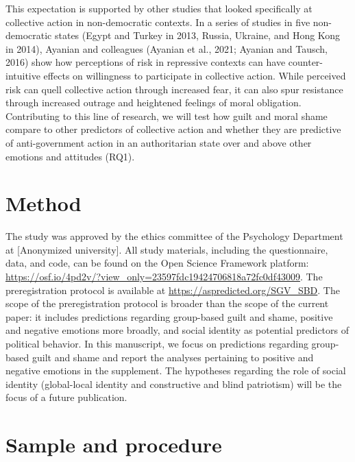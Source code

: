 \documentclass[
]{article}
\begin{document}
This expectation is supported by other studies that looked specifically at collective action in non-democratic contexts. In a series of studies in five non-democratic states (Egypt and Turkey in 2013, Russia, Ukraine, and Hong Kong in 2014), Ayanian and colleagues (Ayanian et al., 2021; Ayanian and Tausch, 2016) show how perceptions of risk in repressive contexts can have counter-intuitive effects on willingness to participate in collective action. While perceived risk can quell collective action through increased fear, it can also spur resistance through increased outrage and heightened feelings of moral obligation. Contributing to this line of research, we will test how guilt and moral shame compare to other predictors of collective action and whether they are predictive of anti-government action in an authoritarian state over and above other emotions and attitudes (RQ1).

\allsectionsfont{\centering}

\section*{Method}\label{method}

The study was approved by the ethics committee of the Psychology Department at {[}Anonymized university{]}. All study materials, including the questionnaire, data, and code, can be found on the Open Science Framework platform: \url{https://osf.io/4pd2v/?view_only=23597fdc19424706818a72fc0df43009}. The preregistration protocol is available at \url{https://aspredicted.org/SGV_SBD}. The scope of the preregistration protocol is broader than the scope of the current paper: it includes predictions regarding group-based guilt and shame, positive and negative emotions more broadly, and social identity as potential predictors of political behavior. In this manuscript, we focus on predictions regarding group-based guilt and shame and report the analyses pertaining to positive and negative emotions in the supplement. The hypotheses regarding the role of social identity (global-local identity and constructive and blind patriotism) will be the focus of a future publication.

\allsectionsfont{\raggedright}

\section*{Sample and procedure}\label{sample-and-procedure}
\end{document}
